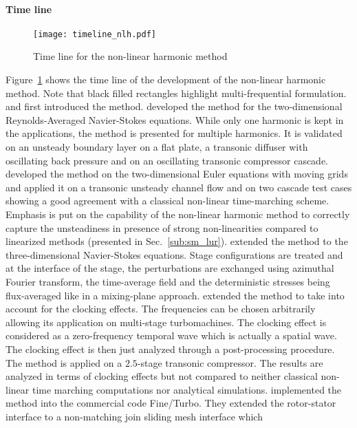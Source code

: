 \paragraph{Time line}
\begin{figure}[htbp]
  \centering
  \texttt{[image: timeline\_nlh.pdf]}
  \caption{Time line for the non-linear harmonic method}
  \label{fig:timeline_nlh}
\end{figure}
Figure~\ref{fig:timeline_nlh} shows the time line of the
development of the non-linear harmonic method. 
Note that black filled
rectangles highlight multi-frequential formulation.
\citet{He1998}
and \citet{Ning1998} first introduced the method.
\citet{He1998} developed the method for the 
two-dimensional Reynolds-Averaged Navier-Stokes equations. 
While only one harmonic is
kept in the applications, the method is presented for multiple
harmonics. It is validated on an unsteady boundary layer
on a flat plate, a transonic diffuser with oscillating back pressure
and on an oscillating transonic compressor cascade.
\citet{Ning1998} developed the method on the two-dimensional
Euler equations with moving grids 
and applied it on a transonic unsteady
channel flow and on two cascade test cases
showing a good agreement with a classical non-linear
time-marching scheme. Emphasis is put on the capability
of the non-linear harmonic method to correctly capture
the unsteadiness in presence of strong non-linearities
compared to linearized methods (presented in 
Sec.~\ref{sub:sm_lur}).
\citet{Chen2001} extended the method to the three-dimensional
Navier-Stokes equations. Stage configurations are treated and
at the interface of the stage, the perturbations are exchanged using
azimuthal Fourier transform,
the time-average field and the deterministic stresses
being flux-averaged like in a mixing-plane approach.
\citet{He2002} extended the method
to take into account for the clocking effects. The frequencies
can be chosen arbitrarily allowing its application on multi-stage
turbomachines. The clocking effect is considered as a zero-frequency
temporal wave which is actually a spatial wave. The clocking
effect is then just analyzed through a post-processing procedure.
The method is applied on a $2.5$-stage transonic
compressor. The results are analyzed in terms of clocking effects
but not compared to neither classical non-linear time marching 
computations nor analytical simulations.
\citet{Vilmin2006} implemented the method into
the commercial code Fine/Turbo. They extended the rotor-stator
interface to a non-matching join sliding mesh interface which
